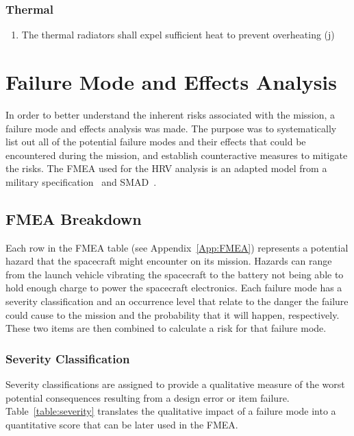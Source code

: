 \documentclass[paper=letter, fontsize=11pt]{scrartcl} %
\numberwithin{equation}{section} %
\numberwithin{figure}{section} %
\numberwithin{table}{section} %
\begin{document}
\subsubsection{Thermal}
\begin{enumerate}
\item The thermal radiators shall expel sufficient heat to prevent overheating (j)
\end{enumerate}



\section{Failure Mode and Effects Analysis}
In order to better understand the inherent risks associated with the mission, a failure mode and effects analysis was made. The purpose was to systematically list out all of the potential failure modes and their effects that could be encountered during the mission, and establish counteractive measures to mitigate the risks. The FMEA used for the HRV analysis is an adapted model from a military specification~\cite{MIL-STD-1629A} and SMAD~\cite{ref12_8}.

\subsection{FMEA Breakdown}
Each row in the FMEA table (see Appendix~\ref{App:FMEA}) represents a potential hazard that the spacecraft might encounter on its mission. Hazards can range from the launch vehicle vibrating the spacecraft to the battery not being able to hold enough charge to power the spacecraft electronics. Each failure mode has a severity classification and an occurrence level that relate to the danger the failure could cause to the mission and the probability that it will happen, respectively. These two items are then combined to calculate a risk for that failure mode.

\subsubsection{Severity Classification}
Severity classifications are assigned to provide a qualitative measure of the worst potential consequences resulting from a design error or item failure. Table~\ref{table:severity} translates the qualitative impact of a failure mode into a quantitative score that can be later used in the FMEA.
\end{document}
